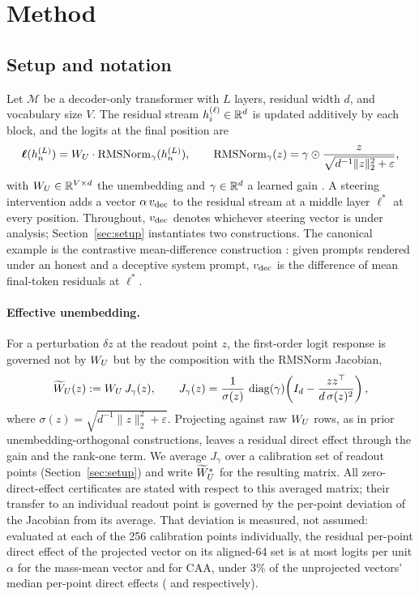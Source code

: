 \section{Method}\label{sec:method}

\subsection{Setup and notation}

Let $\mathcal{M}$ be a decoder-only transformer with $L$ layers, residual width $d$, and vocabulary size $V$. The residual stream $h^{(\ell)}_i \in \mathbb{R}^d$ is updated additively by each block, and the logits at the final position are
\begin{equation}
\bm{\ell}(h^{(L)}_n) = W_{U} \cdot \mathrm{RMSNorm}_\gamma(h^{(L)}_n),
\qquad
\mathrm{RMSNorm}_\gamma(z) = \gamma \odot \frac{z}{\sqrt{d^{-1}\|z\|_2^2 + \varepsilon}},
\label{eq:readout}
\end{equation}
with $W_{U} \in \mathbb{R}^{V \times d}$ the unembedding and $\gamma \in \mathbb{R}^d$ a learned gain \citep{zhang2019rmsnorm}. A steering intervention adds a vector $\alpha\,v_{\mathrm{dec}}$ to the residual stream at a middle layer $\ell^{*}$ at every position. Throughout, $v_{\mathrm{dec}}$ denotes whichever steering vector is under analysis; Section~\ref{sec:setup} instantiates two constructions. The canonical example is the contrastive mean-difference construction \citep{rimsky2024caa,zou2023repe}: given prompts rendered under an honest and a deceptive system prompt, $v_{\mathrm{dec}}$ is the difference of mean final-token residuals at $\ell^{*}$.

\paragraph{Effective unembedding.}
For a perturbation $\delta z$ at the readout point $z$, the first-order logit response is governed not by $W_{U}$ but by the composition with the RMSNorm Jacobian,
\begin{equation}
\widetilde{W}_{U}(z) := W_{U} \, J_{\gamma}(z), \qquad
J_{\gamma}(z) = \frac{1}{\sigma(z)}\,\operatorname{diag}(\gamma)\!\left(I_d - \frac{z z^{\top}}{d\,\sigma(z)^2}\right),
\label{eq:effective}
\end{equation}
where $\sigma(z) = \sqrt{d^{-1}\|z\|_2^2+\varepsilon}$. Projecting against raw $W_{U}$ rows, as in prior unembedding-orthogonal constructions, leaves a residual direct effect through the gain and the rank-one term. We average $J_{\gamma}$ over a calibration set of readout points (Section~\ref{sec:setup}) and write $\widetilde{W}_{U}^{*}$ for the resulting matrix. All zero-direct-effect certificates are stated with respect to this averaged matrix; their transfer to an individual readout point is governed by the per-point deviation of the Jacobian from its average. That deviation is measured, not assumed: evaluated at each of the 256 calibration points individually, the residual per-point direct effect of the projected vector on its aligned-64 set is at most \MmLeakMax{} logits per unit $\alpha$ for the mass-mean vector and \DecLeakMax{} for CAA, under $3\%$ of the unprojected vectors' median per-point direct effects (\MmLeakScale{} and \DecLeakScale{} respectively).

